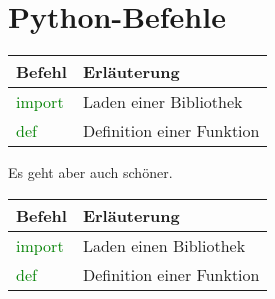 \documentclass[12pt,a4paper]{scrbook}
\newcommand{\PYTHON}[1]{\textcolor{green}{\ttfamily #1}}
\newenvironment{PythonDef}%
{%
\begin{tabular}{l|l}
    \textbf{Befehl} & \textbf{Erläuterung} \\ \hline 
}%
{%
\end{tabular}%
}
\begin{document}
\chapter{Python-Befehle}

\begin{PythonDef}
 \PYTHON{import} & Laden einer Bibliothek \\ 
 \PYTHON{def}    & Definition einer Funktion \\
\end{PythonDef}
 
\bigskip
    
Es geht aber auch schöner.

\renewenvironment{PythonDef}%
{%
    \renewcommand{\arraystretch}{1.5}    
    \begin{center}
        \begin{tabular}{l|l}
            \textbf{Befehl} & \textbf{Erläuterung} \\ \hline 
        }%
        {%
        \end{tabular}%
    \end{center}%
}


\begin{PythonDef}
    \PYTHON{import} & Laden einen Bibliothek \\ 
    \PYTHON{def}    & Definition einer Funktion \\
\end{PythonDef}

    
\end{document}
